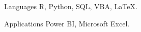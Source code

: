 
\begin{cvskills}

  \cvskill
    {Languages} %
    {R, Python, SQL, VBA, \LaTeX.} %

  \cvskill
    {Applications} %
    {Power BI, Microsoft Excel.} %

\end{cvskills}